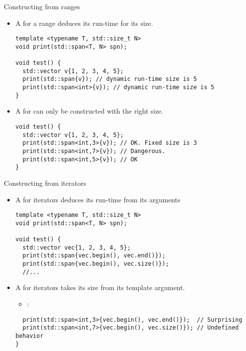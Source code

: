 \begin{frame}[t,fragile]{Constructing from ranges}
\begin{itemize}
  \item A   for a range
        deduces its run-time  for its size.
\begin{lstlisting}
template <typename T, std::size_t N>
void print(std::span<T, N> spn);

void test() {
  std::vector v{1, 2, 3, 4, 5};
  print(std::span{v}); // dynamic run-time size is 5
  print(std::span<int>{v}); // dynamic run-time size is 5
}
\end{lstlisting}

  \item A   for 
        can only be constructed with the right size.
\begin{lstlisting}
void test() {
  std::vector v{1, 2, 3, 4, 5};
  print(std::span<int,3>{v}); // OK. Fixed size is 3
  print(std::span<int,7>{v}); // Dangerous.
  print(std::span<int,5>{v}); // OK
}
\end{lstlisting}
\end{itemize}
\end{frame}

\begin{frame}[t,fragile]{Constructing from iterators}
\begin{itemize}
  \item A   for iterators
        deduces its run-time  from its arguments
\begin{lstlisting}
template <typename T, std::size_t N>
void print(std::span<T, N> spn);

void test() {
  std::vector vec{1, 2, 3, 4, 5};
  print(std::span{vec.begin(), vec.end()});
  print(std::span{vec.begin(), vec.size()});
  //...
\end{lstlisting}

  \item A   for iterators
        takes its size from its template argument.
    \begin{itemize}
      \item {}: 
    \end{itemize}
\begin{lstlisting}
  print(std::span<int,3>{vec.begin(), vec.end()});  // Surprising
  print(std::span<int,7>{vec.begin(), vec.size()}); // Undefined behavior
}
\end{lstlisting}

\end{itemize}
\end{frame}
